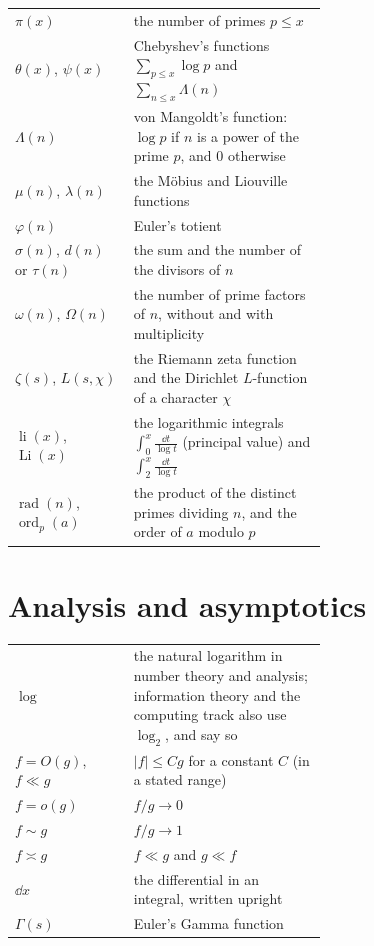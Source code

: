 \begin{center}\small
\begin{tabular}{@{}lp{0.62\linewidth}@{}}
$\pi(x)$ & the number of primes $p\le x$\\
$\theta(x)$, $\psi(x)$ & Chebyshev's functions $\sum_{p\le x}\log p$ and $\sum_{n\le x}\Lambda(n)$\\
$\Lambda(n)$ & von Mangoldt's function: $\log p$ if $n$ is a power of the prime $p$, and $0$ otherwise\\
$\mu(n)$, $\lambda(n)$ & the M\"obius and Liouville functions\\
$\varphi(n)$ & Euler's totient\\
$\sigma(n)$, $d(n)$ or $\tau(n)$ & the sum and the number of the divisors of $n$\\
$\omega(n)$, $\Omega(n)$ & the number of prime factors of $n$, without and with multiplicity\\
$\zeta(s)$, $L(s,\chi)$ & the Riemann zeta function and the Dirichlet $L$-function of a character $\chi$\\
$\operatorname{li}(x)$, $\operatorname{Li}(x)$ & the logarithmic integrals $\int_0^x\frac{\dd t}{\log t}$ (principal value) and $\int_2^x\frac{\dd t}{\log t}$\\
$\operatorname{rad}(n)$, $\operatorname{ord}_p(a)$ & the product of the distinct primes dividing $n$, and the order of $a$ modulo $p$
\end{tabular}
\end{center}

\section{Analysis and asymptotics}

\begin{center}\small
\begin{tabular}{@{}lp{0.62\linewidth}@{}}
$\log$ & the natural logarithm in number theory and analysis; information theory and the computing track also use
$\log_2$, and say so\\
$f=O(g)$, $f\ll g$ & $|f|\le Cg$ for a constant $C$ (in a stated range)\\
$f=o(g)$ & $f/g\to0$\\
$f\sim g$ & $f/g\to1$\\
$f\asymp g$ & $f\ll g$ and $g\ll f$\\
$\dd x$ & the differential in an integral, written upright\\
$\Gamma(s)$ & Euler's Gamma function
\end{tabular}
\end{center}

